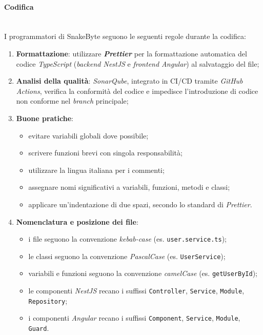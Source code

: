 \documentclass[10pt, letterpaper]{article}
\newcommand{\trisubsection}[1]{\paragraph{#1}\mbox{}\\}
\begin{document}
\trisubsection{Codifica}
I programmatori di SnakeByte seguono le seguenti regole durante la codifica:

\begin{enumerate}
    \item \textbf{Formattazione}: utilizzare \textbf{\textit{Prettier}} per la formattazione automatica del codice \textit{TypeScript} (\textit{backend NestJS} e \textit{frontend Angular}) al salvataggio del file;
    \item \textbf{Analisi della qualità}: \textit{SonarQube}, integrato in CI/CD tramite \textit{GitHub Actions}, verifica la conformità del codice e impedisce l'introduzione di codice non conforme nel \textit{branch} principale;
    \item \textbf{Buone pratiche}:
    \begin{itemize}
        \item evitare variabili globali dove possibile;
        \item scrivere funzioni brevi con singola responsabilità;
        \item utilizzare la lingua italiana per i commenti;
        \item assegnare nomi significativi a variabili, funzioni, metodi e classi;
        \item applicare un'indentazione di due spazi, secondo lo standard di \textit{Prettier}.
    \end{itemize}
    \item \textbf{Nomenclatura e posizione dei file}:
    \begin{itemize}
        \item i file seguono la convenzione \textit{kebab-case} (es. \texttt{user.service.ts});
        \item le classi seguono la convenzione \textit{PascalCase} (es. \texttt{UserService});
        \item variabili e funzioni seguono la convenzione \textit{camelCase} (es. \texttt{getUserById});
        \item le componenti \textit{NestJS} recano i suffissi \texttt{Controller}, \texttt{Service}, \texttt{Module}, \texttt{Repository};
        \item i componenti \textit{Angular} recano i suffissi \texttt{Component}, \texttt{Service}, \texttt{Module}, \texttt{Guard}.
    \end{itemize}
\end{enumerate}
\end{document}
